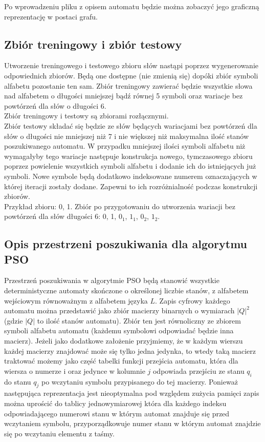 \documentclass{llncs}
\begin{document}
Po wprowadzeniu pliku z opisem automatu będzie można zobaczyć jego graficzną reprezentację w postaci grafu.

\subsection{Zbiór treningowy i zbiór testowy}

Utworzenie treningowego i testowego zbioru słów nastąpi poprzez wygenerowanie odpowiednich zbiorów. Będą one dostępne (nie zmienią się) dopóki zbiór symboli alfabetu pozostanie ten sam. Zbiór treningowy zawierać będzie wszystkie słowa nad alfabetem o długości mniejszej bądź równej 5 symboli oraz wariacje bez powtórzeń dla słów o długości 6.\\

Zbiór treningowy i testowy są zbiorami rozłącznymi.\\

Zbiór testowy składać się będzie ze słów będących wariacjami bez powtórzeń dla słów o  długości nie mniejszej niż 7 i nie większej niż maksymalna ilość stanów poszukiwanego automatu. W przypadku mniejszej ilości symboli alfabetu niż wymagałyby tego wariacje następuje konstrukcja nowego, tymczasowego zbioru poprzez powielenie wszystkich symboli alfabetu i dodanie ich do istniejących już symboli. Nowe symbole będą dodatkowo indeksowane numerem oznaczających w której iteracji zostały dodane. Zapewni to ich rozróżnialność podczas konstrukcji zbiorów.\\

Przykład zbioru: {0, 1}. 
Zbiór po przygotowaniu do utworzenia wariacji bez powtórzeń dla słów długości 6: {0, 1, $0_{1}$, $1_{1}$, $0_{2}$, $1_{2}$}.


\subsection{Opis przestrzeni poszukiwania dla algorytmu PSO}

Przestrzeń poszukiwania w algorytmie PSO będą stanowić wszystkie deterministyczne automaty skończone o określonej liczbie stanów, z alfabetem wejściowym równoważnym z alfabetem języka $L$. Zapis cyfrowy każdego automatu można przedstawić jako zbiór macierzy binarnych o wymiarach $|Q|^2$ (gdzie $|Q|$ to ilość stanów automatu). Zbiór ten jest równoliczny ze zbiorem symboli alfabetu automatu (każdemu symbolowi odpowiadać będzie inna macierz). Jeżeli jako dodatkowe założenie przyjmiemy, że w każdym wierszu każdej macierzy znajdować może się tylko jedna jedynka, to wtedy taką macierz traktować możemy jako część tabelki funkcji przejścia automatu, która dla wiersza o numerze i oraz jedynce w kolumnie $j$ odpowiada przejściu ze stanu $q_{i}$ do stanu $q_{j}$ po wczytaniu symbolu przypisanego do tej macierzy. Ponieważ następująca reprezentacja jest nieoptymalna pod względem zużycia pamięci zapis można uprościć do tablicy jednowymiarowej która dla każdego indeksu odpowiadającego numerowi stanu w którym automat znajduje się przed wczytaniem symbolu, przyporządkowuje numer stanu w którym automat znajdzie się po wczytaniu elementu z taśmy.\\
\end{document}
